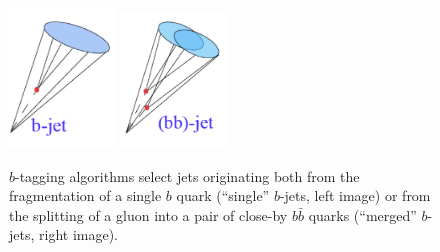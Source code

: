 \begin{figure}[h]
\centering
\includegraphics[width=0.25\textwidth]{FIGS/Single_b.png}
\hspace{1cm}
\includegraphics[width=0.25\textwidth]{FIGS/Merged_bb.png}
  \caption{$b$-tagging algorithms select jets originating both from the fragmentation of a single $b$ quark (``single'' $b$-jets, left image) or from the splitting of a gluon into a pair of close-by $b \bar{b}$ quarks (``merged'' $b$-jets, right image).}
  \label{fig:gbbcartoon}
\end{figure}

